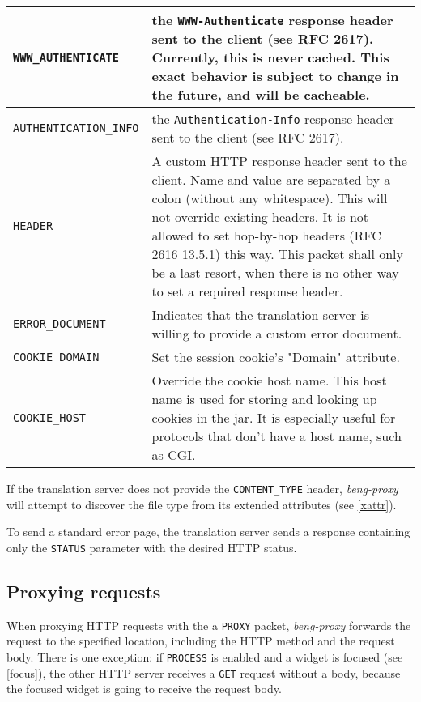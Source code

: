 \documentclass[a4paper,12pt]{article}
\begin{document}
\begin{longtable}{|l|p{8cm}|}
\verb|WWW_AUTHENTICATE| & the \texttt{WWW-Authenticate} response
header sent to the client (see RFC 2617).  Currently, this is never
cached.  This exact behavior is subject to change in the future, and
will be cacheable. \\

\hline

\verb|AUTHENTICATION_INFO| & the \texttt{Authentication-Info}
response header sent to the client (see RFC 2617). \\

\hline

\verb|HEADER| & A custom HTTP response header sent to the client.
Name and value are separated by a colon (without any whitespace).
This will not override existing headers.  It is not allowed to set
hop-by-hop headers (RFC 2616 13.5.1) this way.  This packet shall only
be a last resort, when there is no other way to set a required
response header. \\

\hline

\verb|ERROR_DOCUMENT| & Indicates that the translation server is
willing to provide a custom error document. \\

\hline

\verb|COOKIE_DOMAIN| & Set the session cookie's "Domain" attribute. \\

\hline

\verb|COOKIE_HOST| & Override the cookie host name.  This host name
is used for storing and looking up cookies in the jar.  It is
especially useful for protocols that don't have a host name, such as
CGI. \\

\hline
\end{longtable}

If the translation server does not provide the \verb|CONTENT_TYPE|
header, \emph{beng-proxy} will attempt to discover the file type from
its extended attributes (see \ref{xattr}).

To send a standard error page, the translation server sends a response
containing only the \verb|STATUS| parameter with the desired HTTP
status.

\subsection{Proxying requests}

When proxying HTTP requests with the a \verb|PROXY| packet,
\emph{beng-proxy} forwards the request to the specified location,
including the HTTP method and the request body.  There is one
exception: if \verb|PROCESS| is enabled and a widget is focused (see
\ref{focus}), the
other HTTP server receives a \verb|GET| request without a body,
because the focused widget is going to receive the request body.
\end{document}
